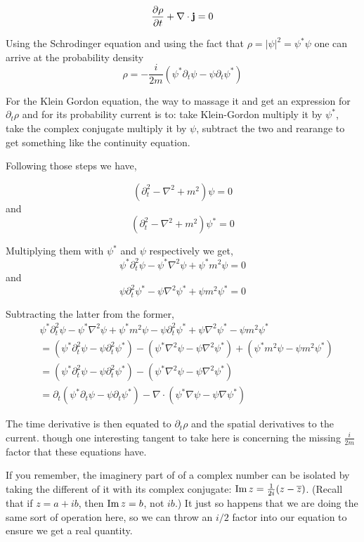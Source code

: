 $$
\frac{\partial\rho}{\partial t} + \nabla\cdot \boldsymbol{\mathbf{j}} = 0
$$


Using the Schrodinger equation and using the fact that $\rho = |\psi|^2 = \psi^* \psi$ one
can arrive at the probability density
$$
\rho = 
-\frac{i}{2m} \left( \psi^* \partial_t \psi - \psi \partial_t \psi^* \right)
$$

For the Klein Gordon equation, the way to massage it and get an expression for $\partial_t \rho$
and for its probability current is to:
take Klein-Gordon multiply it by $\psi^*$,
take the complex conjugate multiply it by $\psi$,
subtract the two and rearange to get something like the continuity equation.

Following those steps we have,

$$
\left( \partial_{t}^{2} - \nabla^2 + m^2 \right) \psi = 0
$$
and
$$
\left( \partial_{t}^{2} - \nabla^2 + m^2 \right) \psi^* = 0
$$

Multiplying them with $\psi^*$ and $\psi$ respectively we get,
$$
\psi^* \partial_{t}^{2} \psi - \psi^* \nabla^2 \psi + \psi^* m^2 \psi = 0
$$
and
$$
\psi \partial_{t}^{2} \psi^* - \psi \nabla^2 \psi^* + \psi m^2 \psi^* = 0
$$

Subtracting the latter from the former,
\begin{align*}
& \psi^* \partial_{t}^{2} \psi - \psi^* \nabla^2 \psi + \psi^* m^2 \psi -
    \psi \partial_{t}^{2} \psi^* + \psi \nabla^2 \psi^* - \psi m^2 \psi^* \\
&= \left( \psi^* \partial_{t}^{2} \psi - \psi \partial_{t}^{2} \psi^* \right)
    - \left( \psi^* \nabla^2 \psi - \psi \nabla^2 \psi^* \right)
    + \left( \psi^* m^2 \psi - \psi m^2 \psi^* \right) \\
&= \left( \psi^* \partial_{t}^{2} \psi - \psi \partial_{t}^{2} \psi^* \right)
    - \left( \psi^* \nabla^2 \psi - \psi \nabla^2 \psi^* \right) \\
&= \partial_t \left( \psi^* \partial_{t} \psi - \psi \partial_{t} \psi^* \right)
    -\nabla \cdot \left( \psi^* \nabla \psi - \psi \nabla \psi^* \right)
\end{align*}

The time derivative is then equated to $\partial_t \rho$ and the spatial derivatives to the current.
though one interesting tangent to take here is concerning the missing $\frac{i}{2m}$ factor that
these equations have.

If you remember, the imaginery part of of a complex number can be isolated by taking the different of it with its
complex conjugate: $\operatorname{Im}{z} = \frac{1}{2i}(z - \overline{z})$. (Recall that if $z = a +ib$, then $\operatorname{Im}{z} = b$, not $ib$.)
It just so happens that we are doing the same sort of operation here, so we can throw an $i/2$ factor into our equation
to ensure we get a real quantity.


